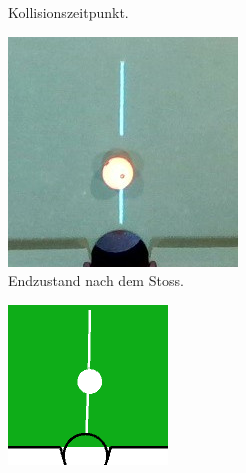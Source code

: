 \begin{figure}[h!]
\begin{subfigure}[t]{0.2\textwidth}
        \caption{Kollisionszeitpunkt.}
        \label{fig:simulation_vs_reality_1_0028_0032_collision}
    \end{subfigure}
    \hfill
    \begin{subfigure}[t]{0.2\textwidth}
        \centering
        \includegraphics[width=1.0\linewidth]{../common/04_results/resources/simulation_vs_reality/simulation_vs_reality_1_0028_0032_end_cut.jpg}
        \caption{Endzustand nach dem Stoss.}
        \label{fig:simulation_vs_reality_1_0028_0032_end}
    \end{subfigure}
    \hfill
    \begin{subfigure}[t]{0.2\textwidth}
        \centering
        \includegraphics[width=1.0\linewidth]{../common/04_results/resources/simulation_vs_reality/simulation_vs_reality_1_0028_0032_simulation_cut.png}

\end{subfigure}
\end{figure}
